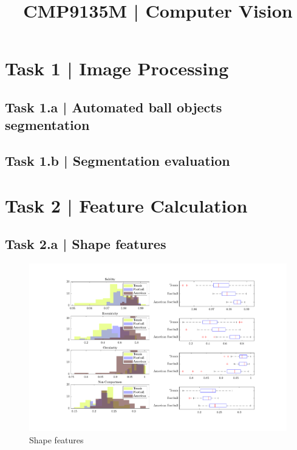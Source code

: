 \documentclass[conference]{IEEEtran}
\begin{document}
\title{CMP9135M | Computer Vision}

\author{
}

\maketitle

\begin{abstract}
\end{abstract}

\begin{IEEEkeywords}
\end{IEEEkeywords}

\section*{Task 1 | Image Processing}

\subsection*{Task 1.a | Automated ball objects segmentation}

\subsection*{Task 1.b | Segmentation evaluation}

\section*{Task 2 | Feature Calculation}

\subsection*{Task 2.a | Shape features}

\begin{figure}[htbp]
    \centering
    \includegraphics[width=\columnwidth]{figures/shape_feats.pdf}
    \caption{Shape features}
    \label{fig:shape_feats}
\end{figure}
\end{document}
